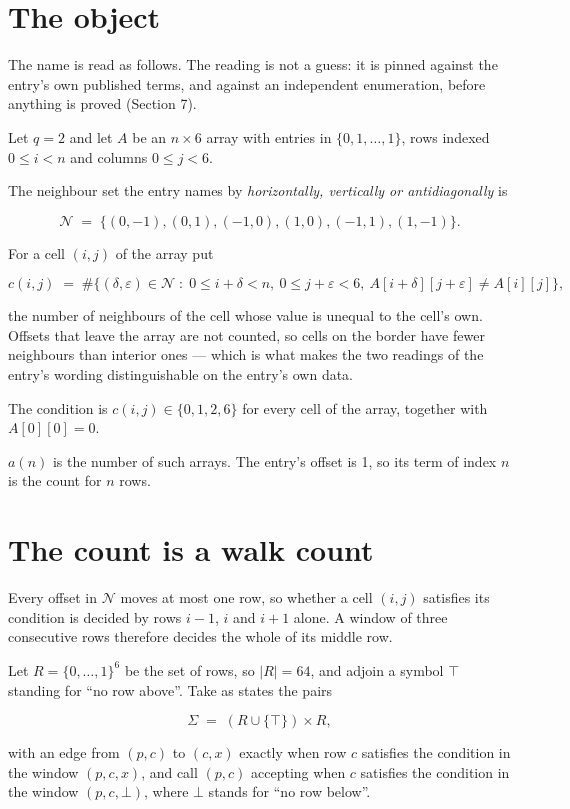 \documentclass[11pt]{article}
\theoremstyle{definition}
\begin{document}
\section{The object}

The name is read as follows. The reading is not a guess: it is pinned against the entry's own published terms, and against an independent enumeration, before anything is proved (Section 7).

Let $q = 2$ and let $A$ be an $n \times 6$ array with entries in $\{0,1,\dots,1\}$, rows indexed $0 \le i < n$ and columns $0 \le j < 6$.

The neighbour set the entry names by {\itshape horizontally, vertically or antidiagonally} is

\[\mathcal{N} \;=\; \{(0,-1), (0,1), (-1,0), (1,0), (-1,1), (1,-1)\}.\]

For a cell $(i,j)$ of the array put

\[c(i,j) \;=\; \#\bigl\{(\delta,\varepsilon)\in\mathcal{N} \;:\; 0\le i+\delta<n,\ 0\le j+\varepsilon<6,\ A[i+\delta][j+\varepsilon] \neq A[i][j]\bigr\},\]

the number of neighbours of the cell whose value is unequal to the cell's own. Offsets that leave the array are not counted, so cells on the border have fewer neighbours than interior ones --- which is what makes the two readings of the entry's wording distinguishable on the entry's own data.

The condition is $c(i,j) \in \{0, 1, 2, 6\}$ for every cell of the array, together with $A[0][0]=0$.

$a(n)$ is the number of such arrays. The entry's offset is 1, so its term of index $n$ is the count for $n$ rows.

\section{The count is a walk count}

Every offset in $\mathcal{N}$ moves at most one row, so whether a cell $(i,j)$ satisfies its condition is decided by rows $i-1$, $i$ and $i+1$ alone. A window of three consecutive rows therefore decides the whole of its middle row.

Let $R = \{0,\dots,1\}^{6}$ be the set of rows, so $|R| = 64$, and adjoin a symbol $\top$ standing for ``no row above''. Take as states the pairs

\[\Sigma \;=\; (R \cup \{\top\}) \times R,\]

with an edge from $(p,c)$ to $(c,x)$ exactly when row $c$ satisfies the condition in the window $(p,c,x)$, and call $(p,c)$ accepting when $c$ satisfies the condition in the window $(p,c,\bot)$, where $\bot$ stands for ``no row below''.
\end{document}
